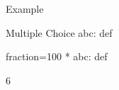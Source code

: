 \documentclass{article}
\begin{document}
\begin{quiz}{Example}
\begin{multi}[feedback={abc: def}]{Multiple Choice}
abc: def
\item[fraction=100]* abc: def
\item 6
\end{multi}

\end{quiz}
\end{document}
